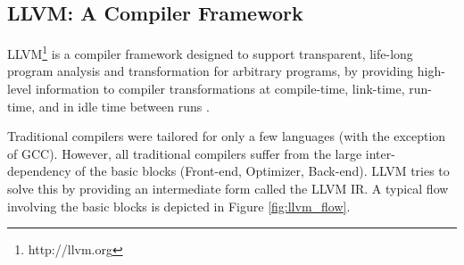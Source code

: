 


\subsection{LLVM: A Compiler Framework}
\label{llvm}

LLVM\footnote{http://llvm.org} is a compiler framework designed to
support transparent, life-long program analysis and transformation for
arbitrary programs, by providing high-level information to compiler
transformations at compile-time, link-time, run-time, and in idle time
between runs \cite{LLVM:CGO04}.

Traditional compilers were tailored for only a few languages (with the
exception of GCC). However, all traditional compilers suffer from the
large inter-dependency of the basic blocks (Front-end, Optimizer,
Back-end). LLVM tries to solve this by providing an intermediate form
called the LLVM IR. A typical flow involving the basic blocks is
depicted in Figure \ref{fig:llvm_flow}.

